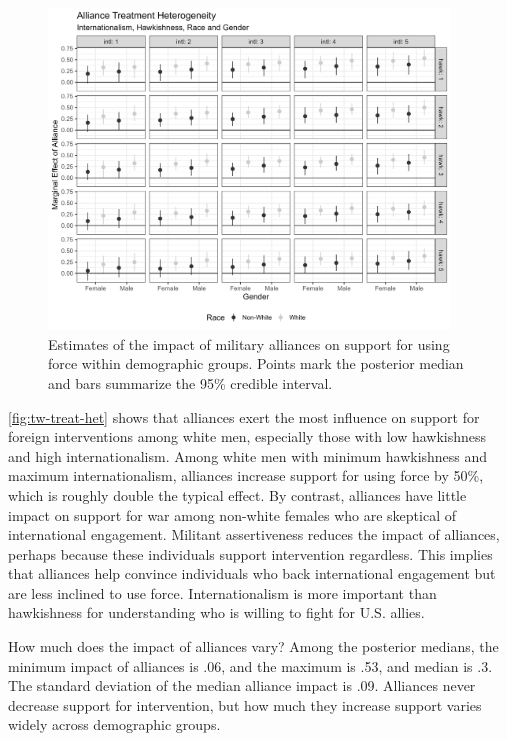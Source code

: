 \documentclass[12pt]{article}
\begin{document}
\begin{figure}[htpb]
	\centering
		\includegraphics[width=0.95\textwidth]{../figures/tw-treat-het.png}
	\caption{Estimates of the impact of military alliances on support for using force within demographic groups. Points mark the posterior median and bars summarize the 95\% credible interval.}
	\label{fig:tw-treat-het}
\end{figure}


\autoref{fig:tw-treat-het} shows that alliances exert the most influence on support for foreign interventions among white men, especially those with low hawkishness and high internationalism.
Among white men with minimum hawkishness and maximum internationalism, alliances increase support for using force by 50\%, which is roughly double the typical effect. 
By contrast, alliances have little impact on support for war among non-white females who are skeptical of international engagement.
Militant assertiveness reduces the impact of alliances, perhaps because these individuals support intervention regardless. 
This implies that alliances help convince individuals who back international engagement but are less inclined to use force. 
Internationalism is more important than hawkishness for understanding who is willing to fight for U.S. allies. 


How much does the impact of alliances vary?
Among the posterior medians, the minimum impact of alliances is .06, and the maximum is .53, and median is .3. 
The standard deviation of the median alliance impact is .09. 
Alliances never decrease support for intervention, but how much they increase support varies widely across demographic groups. 
\end{document}
